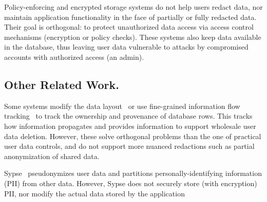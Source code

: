 Policy-enforcing and encrypted storage systems do not help users redact data,
nor maintain application functionality in the face of partially or fully
redacted data. 
%
Their goal is orthogonal: to protect unauthorized data access via access control
mechanisms (encryption or policy checks).
%
These systems also keep data available in the database, thus leaving user data
vulnerable to attacks by compromised accounts with authorized access (\eg an
admin).

%
%
%
%
%
%

%

\subsection{Other Related Work.}
%
Some systems modify the data layout~\cite{usershards} or use fine-grained
information flow tracking~\cite{schengendb} to track the ownership and
provenance of database rows.
%
This tracks how information propagates and provides information to support
wholesale user data deletion.
%
However, these solve orthogonal problems than the one of practical user data
controls, and do not support more nuanced redactions such as partial
anonymization of shared data.
%

%
Sypse~\cite{sypse} pseudonymizes user data and partitions personally-identifying
information (PII) from other data.
%
%
However, Sypse does not securely store (\eg with encryption) PII, nor modify the
actual data stored by the application

